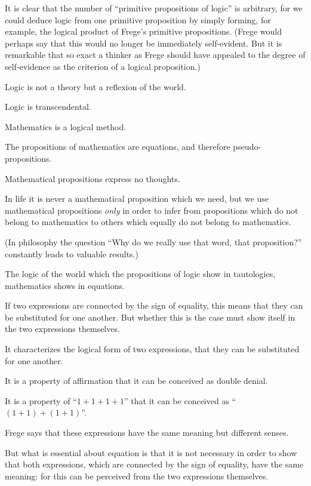 {It is clear that the number of ``primitive propositions
of logic'' is arbitrary, for we could deduce
logic from one primitive proposition by simply
forming, for example, the logical product of Frege's
primitive propositions. (Frege would perhaps say
that this would no longer be immediately self-evident.
But it is remarkable that so exact a
thinker as Frege should have appealed to the
degree of self-evidence as the criterion of a
logical proposition.)}


{Logic is not a theory but a reflexion of the
world.

Logic is transcendental.}


{Mathematics is a logical method.

The propositions of mathematics are equations,
and therefore pseudo-prop\-o\-si\-tions.}


{Mathematical propositions express no thoughts.}


{In life it is never a mathematical proposition
which we need, but we use mathematical propositions
\emph{only} in order to infer from propositions
which do not belong to mathematics to others
which equally do not belong to mathematics.

(In philosophy the question ``Why do we really
use that word, that proposition?'' constantly leads
to valuable results.)}


{The logic of the world which the propositions
of logic show in tautologies, mathematics shows
in equations.}


{{\stretchyspace
If two expressions are connected by the sign of
equality, this means that they can be substituted
for one another. But whether this is the case
must show itself in the two expressions themselves.}

It characterizes the logical form of two expressions,
that they can be substituted for one
another.}


{It is a property of affirmation that it can be
conceived as double denial.

It is a property of ``$1 + 1 + 1 + 1$'' that it can be
conceived as ``$(1 + 1) + (1 + 1)$''.}


{Frege says that these expressions have the same
meaning but different senses.

But what is essential about equation is that it
is not necessary in order to show that both expressions,
which are connected by the sign of
equality, have the same meaning: for this can be
perceived from the two expressions themselves.}


